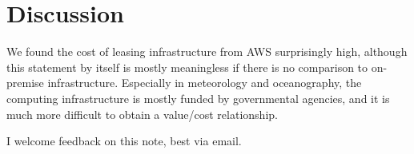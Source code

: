 \documentclass[12pt,a4paper]{article}
\begin{document}
\section{Discussion}

We found the cost of leasing infrastructure from AWS surprisingly high, although this statement by itself is mostly meaningless if there is no comparison to on-premise infrastructure. Especially in meteorology and oceanography, the  computing infrastructure is mostly funded by governmental agencies, and it is much more difficult to obtain a value/cost relationship. 

I welcome feedback on this note, best via email.

	


\end{document}
